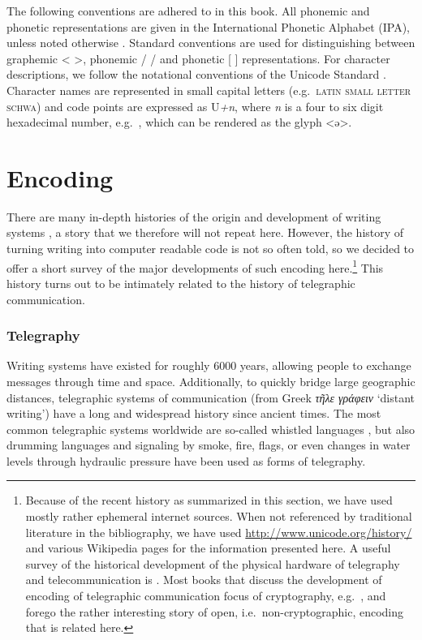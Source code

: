 The following conventions are adhered to in this book. All phonemic and phonetic
representations are given in the International Phonetic Alphabet (IPA), unless
noted otherwise \citep{IPA2015}. Standard conventions are used for
distinguishing between graphemic < >, phonemic / / and phonetic [ ]
representations. For character descriptions, we follow the notational
conventions of the Unicode Standard \citep{Unicode2018}. Character names are
represented in small capital letters (e.g.~\textsc{latin small letter schwa})
and code points are expressed as U\emph{+n}, where \emph{n} is a four to six
digit hexadecimal number, e.g.~, which can be rendered as the glyph <ə>.

\section{Encoding}
\label{encoding}

There are many in-depth histories of the origin and development of writing
systems \citep[e.g.~][]{Robinson1995,Powell2012}, a story that we therefore will
not repeat here. However, the history of turning writing into computer readable
code is not so often told, so we decided to offer a short survey of the major
developments of such encoding here.\footnote{Because of the recent
history as summarized in this section, we have used mostly rather ephemeral
internet sources. When not referenced by traditional literature in the
bibliography, we have used \url{http://www.unicode.org/history/} and various
Wikipedia pages for the information presented here. A useful survey of the
historical development of the physical hardware of telegraphy and
telecommunication is \citet{Huurdeman2003}. Most books that discuss the
development of encoding of telegraphic communication focus of cryptography,
e.g.~\citet{Singh1999}, and forego the rather interesting story of open,
i.e.~non-cryptographic, encoding that is related here.} This history turns out
to be intimately related to the history of telegraphic communication.

\subsubsection*{Telegraphy}

Writing systems have existed for roughly 6000 years, allowing people to exchange
messages through time and space. Additionally, to quickly bridge large geographic
distances, telegraphic systems of communication (from Greek \emph{τῆλε
γράφειν} `distant writing') have a long and widespread history since ancient
times. The most common telegraphic systems worldwide are so-called whistled
languages \citep{Meyer2015}, but also drumming languages \citep{Meyer2012} and
signaling by smoke, fire, flags, or even changes in water levels through
hydraulic pressure have been used as forms of telegraphy. 

